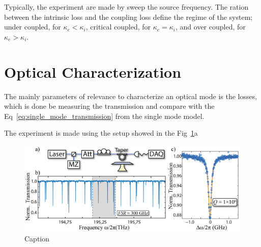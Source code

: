 Typically, the experiment are made by sweep the source frequency. The ration between the intrinsic loss and the coupling loss define the regime of the system; under coupled, for $\kappa_e < \kappa_i$, critical coupled, for $\kappa_e = \kappa_i$, and over coupled, for $\kappa_e > \kappa_i$. 

\section{Optical Characterization}

The mainly parameters of relevance to characterize an optical mode is the losses, which is done be measuring the transmission and compare with the Eq~\ref{eq:single_mode_transmission} from the single mode model. 

The experiment is made using the setup showed in the  Fig~\ref{fig:single_mode_charac}a 
\begin{figure}[h!]
    \centering
    \includegraphics[width = 16cm]{figuras/Dissertation_optical_char_exp.jpg}
    \caption{Caption}
    \label{fig:single_mode_charac}
\end{figure}











